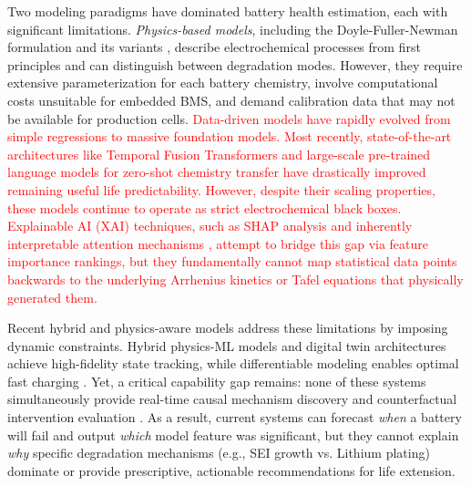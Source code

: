 \documentclass[5p,times,authoryear]{elsarticle}
\begin{document}

Two modeling paradigms have dominated battery health estimation, each with significant limitations.
\textit{Physics-based models}, including the Doyle-Fuller-Newman formulation \citep{doyle1993modeling} and its variants \citep{plett2015battery}, describe electrochemical processes from first principles and can distinguish between degradation modes. However, they require extensive parameterization for each battery chemistry, involve computational costs unsuitable for embedded BMS, and demand calibration data that may not be available for production cells.
\textcolor{red}{Data-driven models have rapidly evolved from simple regressions to massive foundation models. Most recently, state-of-the-art architectures like Temporal Fusion Transformers \citep{ma2024battery} and large-scale pre-trained language models for zero-shot chemistry transfer \citep{ren2024pretrained} have drastically improved remaining useful life predictability. However, despite their scaling properties, these models continue to operate as strict electrochemical black boxes. Explainable AI (XAI) techniques, such as SHAP analysis \citep{fan2023interpretable} and inherently interpretable attention mechanisms \citep{wu2024inherent}, attempt to bridge this gap via feature importance rankings, but they fundamentally cannot map statistical data points backwards to the underlying Arrhenius kinetics or Tafel equations that physically generated them.}

Recent hybrid and physics-aware models address these limitations by imposing dynamic constraints. Hybrid physics-ML models \citep{li2022physics, thelen2022integrating, ashraf2024dinn} and digital twin architectures \citep{li2024digitaltwin} achieve high-fidelity state tracking, while differentiable modeling enables optimal fast charging \citep{zhou2023differentiable}. Yet, a critical capability gap remains: none of these systems simultaneously provide real-time causal mechanism discovery \citep{runge2023causal} and counterfactual intervention evaluation \citep{park2023socmanagement}. As a result, current systems can forecast \textit{when} a battery will fail and output \textit{which} model feature was significant, but they cannot explain \textit{why} specific degradation mechanisms (e.g., SEI growth vs. Lithium plating) dominate or provide prescriptive, actionable recommendations for life extension.
\end{document}

